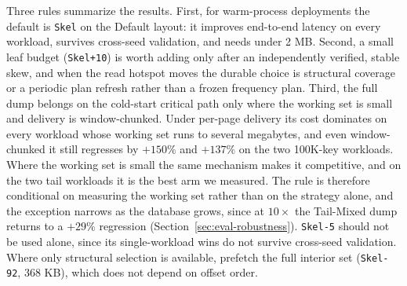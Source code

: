 \documentclass[sigconf, nonacm]{acmart}
\begin{document}
Three rules summarize the results. First, for warm-process deployments the default is \texttt{Skel} on the Default layout: it improves end-to-end latency on every workload, survives cross-seed validation, and needs under 2 MB. Second, a small leaf budget (\texttt{Skel+10}) is worth adding only after an independently verified, stable skew, and when the read hotspot moves the durable choice is structural coverage or a periodic plan refresh rather than a frozen frequency plan. Third, the full dump belongs on the cold-start critical path only where the working set is small and delivery is window-chunked. Under per-page delivery its cost dominates on every workload whose working set runs to several megabytes, and even window-chunked it still regresses by $+150\%$ and $+137\%$ on the two 100K-key workloads. Where the working set is small the same mechanism makes it competitive, and on the two tail workloads it is the best arm we measured. The rule is therefore conditional on measuring the working set rather than on the strategy alone, and the exception narrows as the database grows, since at $10\times$ the Tail-Mixed dump returns to a $+29\%$ regression (Section~\ref{sec:eval-robustness}). \texttt{Skel-5} should not be used alone, since its single-workload wins do not survive cross-seed validation. Where only structural selection is available, prefetch the full interior set (\texttt{Skel-92}, 368 KB), which does not depend on offset order.
\end{document}
